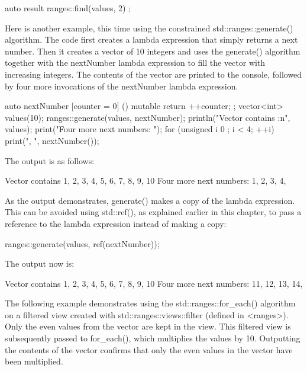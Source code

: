 \begin{cpp}
auto result { ranges::find(values, 2) };
\end{cpp}


Here is another example, this time using the constrained std::ranges::generate() algorithm. The code first creates a lambda expression that simply returns a next number. Then it creates a vector of 10 integers and uses the generate() algorithm together with the nextNumber lambda expression to fill the vector with increasing integers. The contents of the vector are printed to the console, followed by four more invocations of the nextNumber lambda expression.

\begin{cpp}
auto nextNumber { [counter = 0] () mutable { return ++counter; } };
vector<int> values(10);
ranges::generate(values, nextNumber);
println("Vector contains {:n}", values);
print("Four more next numbers: ");
for (unsigned i { 0 }; i < 4; ++i) { print("{}, ", nextNumber()); }
\end{cpp}

The output is as follows:

\begin{shell}
Vector contains 1, 2, 3, 4, 5, 6, 7, 8, 9, 10
Four more next numbers: 1, 2, 3, 4,
\end{shell}

As the output demonstrates, generate() makes a copy of the lambda expression. This can be avoided using std::ref(), as explained earlier in this chapter, to pass a reference to the lambda expression instead of making a copy:

\begin{cpp}
ranges::generate(values, ref(nextNumber));
\end{cpp}

The output now is:

\begin{shell}
Vector contains 1, 2, 3, 4, 5, 6, 7, 8, 9, 10
Four more next numbers: 11, 12, 13, 14,
\end{shell}


The following example demonstrates using the std::ranges::for\_each() algorithm on a filtered view created with std::ranges::views::filter (defined in <ranges>). Only the even values from the vector are kept in the view. This filtered view is subsequently passed to for\_each(), which multiplies the values by 10. Outputting the contents of the vector confirms that only the even values in the vector have been multiplied.


